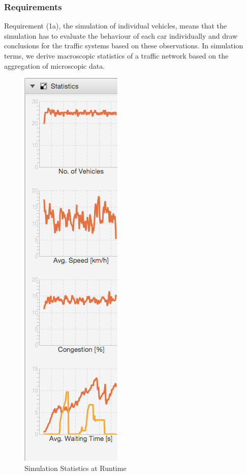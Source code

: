 \subsubsection{Requirements}
Requirement (1a), the simulation of individual vehicles, means that the simulation has to evaluate the behaviour of each car individually and draw conclusions for the traffic systems based on these observations. In simulation terms, we derive macroscopic statistics of a traffic network based on the aggregation of microscopic data.

\begin{figure}
	\begin{center}
		\includegraphics[scale=0.44]{img/graphs.png}
		\caption[Simulation Statistics at Runtime]{Simulation Statistics at Runtime}
		\label{fig:graphs}
	\end{center}
\end{figure}

